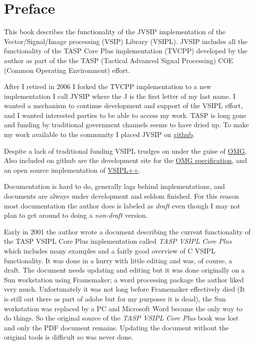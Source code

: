 \chapter{Preface}
This book describes the functionality of the JVSIP implementation of the Vector/Signal/Image processing (VSIP) Library (VSIPL).  JVSIP includes all the functionality of the TASP Core Plus implementation (TVCPP) developed by the author as part of the the TASP (Tactical Advanced Signal Processing) COE (Common Operating Environment) effort.  

After I retired in 2006 I forked the TVCPP implementation to a new implementation I call JVSIP where the J is the first letter of my last name.  I wanted a mechanism to continue development and support of the VSIPL effort, and I wanted interested parties to be able to access my work. TASP is long gone and funding by traditional government channels seems to have dried up. To make my work available to the community I placed JVSIP on  \href{https://github.com/rrjudd/jvsip?}{{github}}. 

Despite a lack of traditional funding VSIPL trudges on under the guise of \href{http://www.omg.org/spec/VSIPL/}{{OMG}}. Also included on github are the development site for the \href{https://github.com/vsip/specs/tree/master/vsipl}{{OMG specification}}, and an open source implementation of \href{https://github.com/openvsip/openvsip}{{VSIPL++}}.  

Documentation is hard to do, generally lags behind implementations, and documents are always under development and seldom finished.  For this reason most documentation the author does is labeled as \emph{draft} even though I may not plan to get around to doing a \emph{non-draft} version.

Early in 2001 the author wrote a document describing the current functionality of the TASP VSIPL Core Plus implementation called \emph{TASP VSIPL Core Plus} which includes many examples and a fairly good overview of C VSIPL functionality. It was done in a hurry with little editing and was, of course, a draft.  The document needs updating and editing but it was done originally on a Sun workstation using Framemaker; a word processing package the author liked very much. Unfortunately it was not long before Framemaker effectively died (It is still out there as part of adobe but for my purposes it is dead), the Sun workstation was replaced by a PC and Microsoft Word became the only way to do things. So the original source of the \emph{TASP VSIPL Core Plus} book was lost and only the PDF document remains.  Updating the document without the original tools is difficult so was never done.

